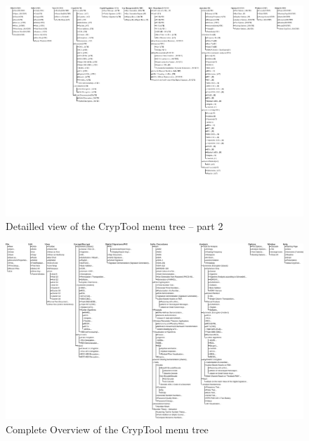 \begin{figure}[b]
\begin{center}
\includegraphics[scale=1.1, clip, viewport=400 190 784 598]{figures/cryptool-menu-detail-en}
\caption{Detailled view of the CrypTool menu tree -- part 2}
\label{menu-detail-2}
\end{center}
\end{figure}

\begin{figure}[hb]
\begin{center}
\includegraphics[scale=0.75, angle=270, viewport=14 107 779 590]{figures/cryptool-menu-en}
\vspace{-18pt}
\caption{Complete Overview of the CrypTool menu tree} 
\label{menuoverview}
\end{center}
\end{figure}
